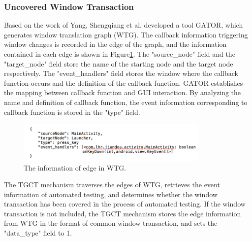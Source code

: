 
\subsubsection{Uncovered Window Transaction}
Based on the work of Yang, Shengqiang et al.\cite{yang2018static} developed a tool GATOR, which generates window translation graph (WTG). The callback information triggering window changes is recorded in the edge of the graph, and the information contained in each edge is shown in Figure\ref{fig:info}. The "source\_node" field and the "target\_node" field store the name of the starting node and the target node respectively. The "event\_handlers" field stores the window where the callback function occurs and the definition of the callback function. GATOR establishes the mapping between callback function and GUI interaction. By analyzing the name and definition of callback function, the event information corresponding to callback function is stored in the "type" field.
\begin{figure}[htbp]
\centering
\centerline{\includegraphics[width=\columnwidth,height=2cm]{fig/6.png}}
\caption{The information of edge in WTG.}
\label{fig:info}
\end{figure}

The TGCT mechanism traverses the edges of WTG, retrieves the event information of automated testing, and determines whether the window transaction has been covered in the process of automated testing. If the window transaction is not included, the TGCT mechanism stores the edge information from WTG in the format of common window transaction, and sets the "data\_type" field to 1. 



